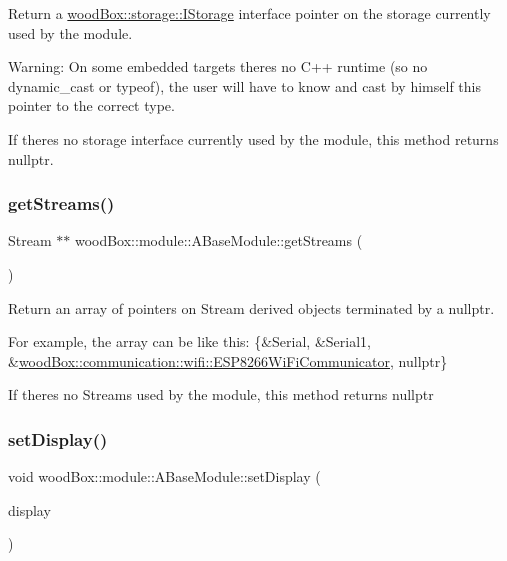 Return a \mbox{\hyperlink{classwood_box_1_1storage_1_1_i_storage}{wood\+Box\+::storage\+::\+I\+Storage}} interface pointer on the storage currently used by the module.

Warning\+: On some embedded targets there\textquotesingle{}s no C++ runtime (so no {\ttfamily dynamic\+\_\+cast} or {\ttfamily typeof}), the user will have to know and cast by himself this pointer to the correct type.

If there\textquotesingle{}s no storage interface currently used by the module, this method returns {\ttfamily nullptr}. \mbox{\label{classwood_box_1_1module_1_1_a_base_module_ada9df5e73cb0aee0bada1de17de19a9c}} 
\subsubsection{\texorpdfstring{get\+Streams()}{getStreams()}}
{\footnotesize\ttfamily Stream $\ast$$\ast$ wood\+Box\+::module\+::\+A\+Base\+Module\+::get\+Streams (\begin{DoxyParamCaption}{ }\end{DoxyParamCaption})}

Return an array of pointers on {\ttfamily Stream} derived objects terminated by a {\ttfamily nullptr}.

For example, the array can be like this\+: {\ttfamily \{\&Serial, \&Serial1, \&\mbox{\hyperlink{classwood_box_1_1communication_1_1wifi_1_1_e_s_p8266_wi_fi_communicator}{wood\+Box\+::communication\+::wifi\+::\+E\+S\+P8266\+Wi\+Fi\+Communicator}}, nullptr\}}

If there\textquotesingle{}s no {\ttfamily Stream}s used by the module, this method returns {\ttfamily nullptr} \mbox{\label{classwood_box_1_1module_1_1_a_base_module_a7e99b7d8d59953a8350e9859a475bc6a}} 
\subsubsection{\texorpdfstring{set\+Display()}{setDisplay()}}
{\footnotesize\ttfamily void wood\+Box\+::module\+::\+A\+Base\+Module\+::set\+Display (\begin{DoxyParamCaption}\item[{\mbox{\hyperlink{classwood_box_1_1display_1_1_i_display}{display\+::\+I\+Display}} $\ast$}]{display }\end{DoxyParamCaption})}

